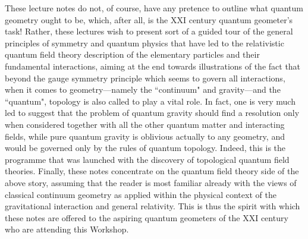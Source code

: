 \documentclass[a4paper,11pt]{article}
\begin{document}
These lecture notes do not, of course, have any pretence to outline what
quantum geometry ought to be, which, after all, is the XXI\coordHE{} century 
quantum geometer's task! Rather, these lectures wish to present sort of a 
guided tour of the general principles of symmetry and quantum physics that 
have led to the relativistic quantum field theory description of the
elementary particles and their fundamental interactions, aiming at the
end towards illustrations of the fact that beyond the gauge symmetry
principle which seems to go\-vern all interactions, when it comes to
geometry---namely the ``continuum" and gravity---and the ``quantum",
topology is also called to play a vital role. In fact, one is very much
led to suggest that the problem of quantum gra\-vi\-ty should find a 
resolution only when considered together with all the other quantum
matter and interacting fields, while pure quantum gravity
is obli\-vious actually to any geometry, and would be governed only by the
rules of quantum topology. Indeed, this is the programme that was 
launched\cite{Wit1,Wit2} with the dis\-co\-ve\-ry of topological quantum 
field theories.\cite{Wit1,Wit2,TQFT}
Finally, these notes concentrate on the quantum field theory side of
the above story, assuming that the reader is most familiar already with
the views of classical continuum geometry as applied within the physical
context of the gravitational interaction and general relativity.
This is thus the spirit with which these notes are offered to the aspiring 
quantum geometers of the XXI\coordHE{} century who are attending this 
Workshop.
\end{document}
